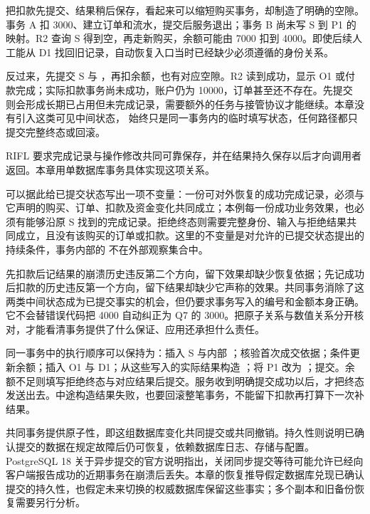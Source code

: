 把扣款先提交、结果稍后保存，看起来可以缩短购买事务，却制造了明确的空隙。事务 A 扣 3000、建立订单和流水，提交后服务退出；事务 B 尚未写 S 到 P1 的映射。R2 查询 S 得到空，再走新购买，余额可能由 7000 扣到 4000。即使后续人工能从 D1 找回旧记录，自动恢复入口当时已经缺少必须遵循的身份关系。

反过来，先提交 S 与 ，再扣余额，也有对应空隙。R2 读到成功，显示 O1 或付款完成；实际扣款事务尚未成功，账户仍为 10000，订单甚至还不存在。先提交  则会形成长期已占用但未完成记录，需要额外的任务与接管协议才能继续。本章没有引入这类可见中间状态， 始终只是同一事务内的临时填写状态，任何路径都只提交完整终态或回滚。

RIFL 要求完成记录与操作修改共同可靠保存，并在结果持久保存以后才向调用者返回。本章用单数据库事务具体实现这项关系\cite{rifl}。



可以据此给已提交状态写出一项不变量：一份可对外恢复的成功完成记录，必须与它声明的购买、订单、扣款及资金变化共同成立；本例每一份成功业务效果，也必须有能够沿原 S 找到的完成记录。拒绝终态则需要完整身份、输入与拒绝结果共同成立，且没有该购买的订单或扣款。这里的不变量是对允许的已提交状态提出的持续条件，事务内部的  不在外部观察集合中。

先扣款后记结果的崩溃历史违反第二个方向，留下效果却缺少恢复依据；先记成功后扣款的历史违反第一个方向，留下结果却缺少它声称的效果。共同事务消除了这两类中间状态成为已提交事实的机会，但仍要求事务写入的编号和金额本身正确。它不会替错误代码把 4000 自动纠正为 Q7 的 3000。把原子关系与数值关系分开核对，才能看清事务提供了什么保证、应用还承担什么责任。



同一事务中的执行顺序可以保持为：插入 S 与内部 ；核验首次成交依据；条件更新余额；插入 O1 与 D1；从这些写入的实际结果构造 ；将 P1 改为 ；提交。余额不足则填写拒绝终态与对应结果后提交。服务收到明确提交成功以后，才把终态发送出去。中途构造结果失败，也要回滚整笔事务，不能留下扣款再打算下一次补结果。

共同事务提供原子性，即这组数据库变化共同提交或共同撤销。持久性则说明已确认提交的数据在规定故障后仍可恢复，依赖数据库日志、存储与配置。PostgreSQL 18 关于异步提交的官方说明指出，关闭同步提交等待可能允许已经向客户端报告成功的近期事务在崩溃后丢失\cite{pg}。本章的恢复推导假定数据库兑现已确认提交的持久性，也假定未来切换的权威数据库保留这些事实；多个副本和旧备份恢复需要另行分析。

